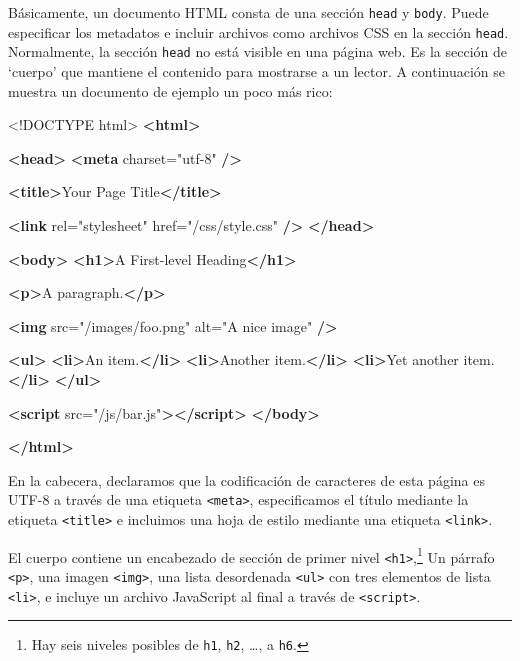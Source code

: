 \documentclass[12pt,]{krantz}
\makeatletter
\newenvironment{Shaded}{\begin{snugshade}}{\end{snugshade}}
\newcommand{\DataTypeTok}[1]{\textcolor[rgb]{0.13,0.29,0.53}{#1}}
\newcommand{\KeywordTok}[1]{\textcolor[rgb]{0.13,0.29,0.53}{\textbf{#1}}}
\newcommand{\NormalTok}[1]{#1}
\newcommand{\OtherTok}[1]{\textcolor[rgb]{0.56,0.35,0.01}{#1}}
\newcommand{\StringTok}[1]{\textcolor[rgb]{0.31,0.60,0.02}{#1}}
\newenvironment{kframe}{%
\medskip{}
\setlength{\fboxsep}{.8em}
 \def\at@end@of@kframe{}%
 \ifinner\ifhmode%
  \def\at@end@of@kframe{\end{minipage}}%
  \begin{minipage}{\columnwidth}%
 \fi\fi%
 \def\FrameCommand##1{\hskip\@totalleftmargin \hskip-\fboxsep
 \colorbox{shadecolor}{##1}\hskip-\fboxsep
     \hskip-\linewidth \hskip-\@totalleftmargin \hskip\columnwidth}%
 \MakeFramed {\advance\hsize-\width
   \@totalleftmargin\z@ \linewidth\hsize
   \@setminipage}}%
 {\par\unskip\endMakeFramed%
 \at@end@of@kframe}
\renewenvironment{Shaded}{\begin{kframe}}{\end{kframe}}
\theoremstyle{definition}
\theoremstyle{definition}
\theoremstyle{definition}
\theoremstyle{remark}
\makeatother
\begin{document}
Básicamente, un documento HTML consta de una sección \texttt{head} y
\texttt{body}. Puede especificar los metadatos e incluir archivos como
archivos CSS en la sección \texttt{head}. Normalmente, la sección
\texttt{head} no está visible en una página web. Es la sección de
`cuerpo' que mantiene el contenido para mostrarse a un lector. A
continuación se muestra un documento de ejemplo un poco más rico:

\begin{Shaded}
\begin{Highlighting}[]
\DataTypeTok{<!DOCTYPE }\NormalTok{html}\DataTypeTok{>}
\KeywordTok{<html>}

  \KeywordTok{<head>}
    \KeywordTok{<meta}\OtherTok{ charset=}\StringTok{"utf-8"} \KeywordTok{/>}
    
    \KeywordTok{<title>}\NormalTok{Your Page Title}\KeywordTok{</title>}
    
    \KeywordTok{<link}\OtherTok{ rel=}\StringTok{"stylesheet"}\OtherTok{ href=}\StringTok{"/css/style.css"} \KeywordTok{/>}
  \KeywordTok{</head>}
  
  \KeywordTok{<body>}
    \KeywordTok{<h1>}\NormalTok{A First-level Heading}\KeywordTok{</h1>}
    
    \KeywordTok{<p>}\NormalTok{A paragraph.}\KeywordTok{</p>}
    
    \KeywordTok{<img}\OtherTok{ src=}\StringTok{"/images/foo.png"}\OtherTok{ alt=}\StringTok{"A nice image"} \KeywordTok{/>}
    
    \KeywordTok{<ul>}
      \KeywordTok{<li>}\NormalTok{An item.}\KeywordTok{</li>}
      \KeywordTok{<li>}\NormalTok{Another item.}\KeywordTok{</li>}
      \KeywordTok{<li>}\NormalTok{Yet another item.}\KeywordTok{</li>}
    \KeywordTok{</ul>}
    
    \KeywordTok{<script}\OtherTok{ src=}\StringTok{"/js/bar.js"}\KeywordTok{></script>}
  \KeywordTok{</body>}

\KeywordTok{</html>}
\end{Highlighting}
\end{Shaded}

En la cabecera, declaramos que la codificación de caracteres de esta
página es UTF-8 a través de una etiqueta
\texttt{\textless{}meta\textgreater{}}, especificamos el título mediante
la etiqueta \texttt{\textless{}title\textgreater{}} e incluimos una hoja
de estilo mediante una etiqueta \texttt{\textless{}link\textgreater{}}.

El cuerpo contiene un encabezado de sección de primer nivel
\texttt{\textless{}h1\textgreater{}},\footnote{Hay seis niveles posibles
  de \texttt{h1}, \texttt{h2}, \ldots{}, a \texttt{h6}.} Un párrafo
\texttt{\textless{}p\textgreater{}}, una imagen
\texttt{\textless{}img\textgreater{}}, una lista desordenada
\texttt{\textless{}ul\textgreater{}} con tres elementos de lista
\texttt{\textless{}li\textgreater{}}, e incluye un archivo JavaScript al
final a través de \texttt{\textless{}script\textgreater{}}.
\end{document}
